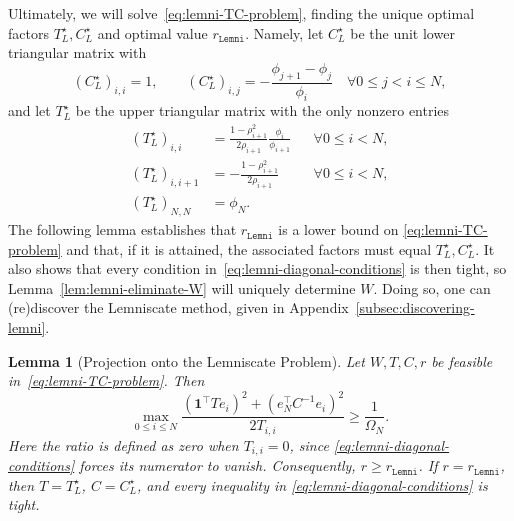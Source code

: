 \documentclass[11pt]{article}
\newtheorem{lemma}[thm]{Lemma}
\begin{document}
Ultimately, we will solve~\eqref{eq:lemni-TC-problem}, finding the unique
optimal factors $T_L^\star,C_L^\star$ and optimal value
$r_\mathtt{Lemni}$. Namely, let $C_L^\star$ be the unit lower triangular matrix
with
\begin{equation}\label{eq:lemni-C-star}
    (C_L^\star)_{i,i}=1,
    \qquad
    (C_L^\star)_{i,j}=-\frac{\phi_{j+1}-\phi_j}{\phi_i}
    \quad \forall 0\leq j<i\leq N,
\end{equation}
and let $T_L^\star$ be the upper triangular matrix with the only
nonzero entries
\begin{equation}\label{eq:lemni-T-star}
\begin{aligned}
    (T_L^\star)_{i,i}
    &=\frac{1-\rho_{i+1}^2}{2\rho_{i+1}}
      \frac{\phi_i}{\phi_{i+1}}
      &&\forall 0\leq i<N,\\
    (T_L^\star)_{i,i+1}
    &=-\frac{1-\rho_{i+1}^2}{2\rho_{i+1}}
      &&\forall 0\leq i<N,\\
    (T_L^\star)_{N,N}&=\phi_N.
\end{aligned}
\end{equation}
The following lemma establishes that $r_\mathtt{Lemni}$ is a lower bound on
\eqref{eq:lemni-TC-problem} and that, if it is attained, the associated
factors must equal $T_L^\star,C_L^\star$. It also shows that every
condition in~\eqref{eq:lemni-diagonal-conditions} is then tight, so
Lemma~\ref{lem:lemni-eliminate-W} will uniquely determine $W$. Doing so, one can (re)discover the Lemniscate method, given in Appendix~\ref{subsec:discovering-lemni}.

\begin{lemma}[Projection onto the Lemniscate Problem]\label{lem:lemni-TC-projection}
Let $W,T,C,r$ be feasible in~\eqref{eq:lemni-TC-problem}. Then
\begin{equation}\label{eq:lemni-projection-bound}
    \max_{0\leq i\leq N}
    \frac{(\mathbf1^\top Te_i)^2
    +(e_N^\top C^{-1}e_i)^2}{2T_{i,i}}
    \geq \frac1{\Omega_N}.
\end{equation}
Here the ratio is defined as zero when $T_{i,i}=0$, since
\eqref{eq:lemni-diagonal-conditions} forces its numerator to vanish.
Consequently, $r\geq r_\mathtt{Lemni}$. If $r=r_\mathtt{Lemni}$, then
$T=T_L^\star$, $C=C_L^\star$, and every inequality in
\eqref{eq:lemni-diagonal-conditions} is tight.
\end{lemma}
\end{document}
